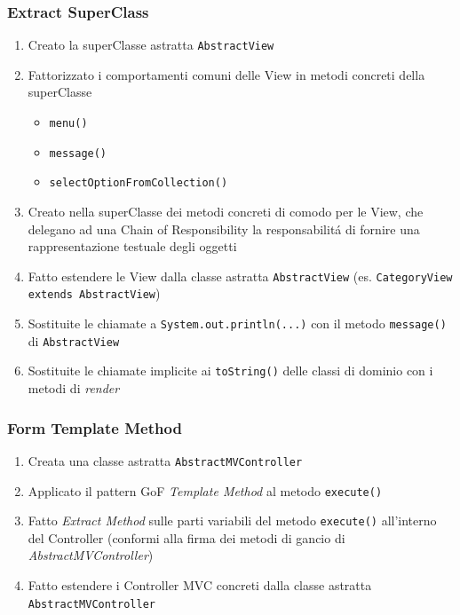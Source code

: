 \begin{frame}
    \frametitle{Extract SuperClass}
    \begin{enumerate}
        \item Creato la superClasse astratta \texttt{AbstractView}
        \item Fattorizzato i comportamenti comuni delle View in metodi concreti della superClasse
          \begin{itemize}
              \item \texttt{menu()}
              \item \texttt{message()}
              \item \texttt{selectOptionFromCollection()}
          \end{itemize}
        \item Creato nella superClasse dei metodi concreti di comodo per le View, che delegano ad una Chain of Responsibility la responsabilitá
              di fornire una rappresentazione testuale degli oggetti
        \item Fatto estendere le View dalla classe astratta \texttt{AbstractView} (es. \texttt{CategoryView extends AbstractView})
        \item Sostituite le chiamate a \texttt{System.out.println(...)} con il metodo \texttt{message()} di \texttt{AbstractView}
        \item Sostituite le chiamate implicite ai \texttt{toString()} delle classi di dominio con i metodi di \emph{render}
    \end{enumerate}
\end{frame}

\begin{frame}
    \frametitle{Form Template Method}
    \begin{enumerate}
        \item Creata una classe astratta \texttt{AbstractMVController}
        \item Applicato il pattern GoF \emph{Template Method} al metodo \texttt{execute()}
        \item Fatto \emph{Extract Method} sulle parti variabili del metodo \texttt{execute()} all'interno del Controller (conformi alla firma dei metodi di gancio di \emph{AbstractMVController})
        \item Fatto estendere i Controller MVC concreti dalla classe astratta \texttt{AbstractMVController}
    \end{enumerate}
\end{frame}

